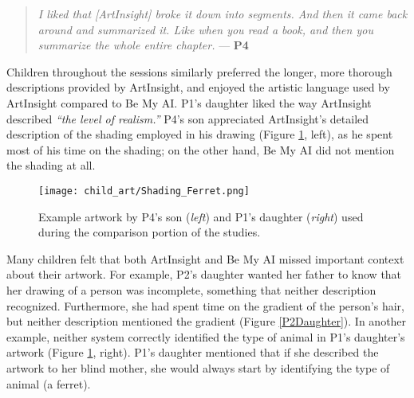 \documentclass[sigconf]{acmart}
\begin{document}
\begin{quote}
    \textit{I liked that [ArtInsight] broke it down into segments. And then it came back around and summarized it. Like when you read a book, and then you summarize the whole entire chapter.} --- \textbf{P4}
\end{quote}

Children throughout the sessions similarly preferred the longer, more thorough descriptions provided by ArtInsight, and enjoyed the artistic language used by ArtInsight compared to Be My AI. P1's daughter liked the way ArtInsight described \textit{``the level of realism.''} P4's son appreciated ArtInsight's detailed description of the shading employed in his drawing (Figure \ref{ShadingFerret}, left), as he spent most of his time on the shading; on the other hand, Be My AI did not mention the shading at all.

\begin{figure}[h]
\centering
\texttt{[image: child\_art/Shading\_Ferret.png]}
\caption{Example artwork by P4's son (\textit{left}) and P1's daughter (\textit{right}) used during the comparison portion of the studies.  }
\label{ShadingFerret}
\vspace{-1em}
\end{figure}

Many children felt that both ArtInsight and Be My AI missed important context about their artwork. For example, P2's daughter wanted her father to know that her drawing of a person was incomplete, something that neither description recognized. Furthermore, she had spent time on the gradient of the person's hair, but neither description mentioned the gradient (Figure \ref{P2Daughter}). In another example, neither system correctly identified the type of animal in P1's daughter's artwork (Figure \ref{ShadingFerret}, right). P1's daughter mentioned that if she described the artwork to her blind mother, she would always start by identifying the type of animal (a ferret).
\end{document}
